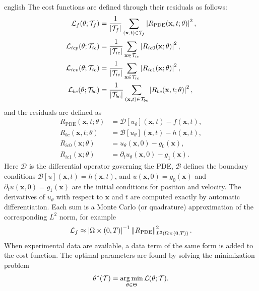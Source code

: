 \begin{hyphenrules}{english}
The cost functions are defined through their residuals as follows:
\begin{align}
  \mathcal{L}_f(\theta;\mathcal{T}_f)&=\frac{1}{\left\lvert \mathcal{T}_f \right\rvert}\sum_{(\mathbf{x},t)\in\mathcal{T}_f}\left\lvert R_{\mathrm{PDE}}(\mathbf{x},t;\theta) \right\rvert^2,\label{eq:loss-f}\\
  \mathcal{L}_{icp}(\theta;\mathcal{T}_{ic})&=\frac{1}{\left\lvert \mathcal{T}_{ic} \right\rvert}\sum_{\mathbf{x}\in\mathcal{T}_{ic}}\left\lvert R_{ic0}(\mathbf{x};\theta) \right\rvert^2,\label{eq:loss-icp}\\
  \mathcal{L}_{icv}(\theta;\mathcal{T}_{ic})&=\frac{1}{\left\lvert \mathcal{T}_{ic} \right\rvert}\sum_{\mathbf{x}\in\mathcal{T}_{ic}}\left\lvert R_{ic1}(\mathbf{x};\theta) \right\rvert^2,\label{eq:loss-icv}\\
  \mathcal{L}_{bc}(\theta;\mathcal{T}_{bc})&=\frac{1}{\left\lvert \mathcal{T}_{bc} \right\rvert}\sum_{(\mathbf{x},t)\in\mathcal{T}_{bc}}\left\lvert R_{bc}(\mathbf{x},t;\theta) \right\rvert^2,\label{eq:loss-bc}
\end{align}
and the residuals are defined as
\begin{align}
  R_{\mathrm{PDE}}(\mathbf{x},t;\theta)&=\mathcal{D}[u_\theta](\mathbf{x},t)-f(\mathbf{x},t), \label{eq:res-pde}\\
  R_{bc}(\mathbf{x},t;\theta)&=\mathcal{B}[u_\theta](\mathbf{x},t)-h(\mathbf{x},t), \label{eq:res-bc}\\
  R_{ic0}(\mathbf{x};\theta)&=u_\theta(\mathbf{x},0)-g_0(\mathbf{x}), \label{eq:res-ic0}\\
  R_{ic1}(\mathbf{x};\theta)&=\partial_t u_\theta(\mathbf{x},0)-g_1(\mathbf{x}). \label{eq:res-ic1}
\end{align}
Here $\mathcal{D}$ is the differential operator governing the PDE, $\mathcal{B}$ defines the boundary
conditions $\mathcal{B}[u](\mathbf{x},t)=h(\mathbf{x},t)$, and $u(\mathbf{x},0)=g_0(\mathbf{x})$ and $\partial_t u(\mathbf{x},0)=g_1(\mathbf{x})$ are the
initial conditions for position and velocity. The derivatives of $u_\theta$ with respect to $\mathbf{x}$ and $t$
are computed exactly by automatic differentiation. Each sum is a Monte Carlo (or quadrature)
approximation of the corresponding $L^2$ norm, for example
\[
  \mathcal{L}_f\approx\left\lvert \Omega\times(0,T) \right\rvert^{-1}\left\lVert R_{\mathrm{PDE}} \right\rVert_{L^2(\Omega\times(0,T))}^2.
\]
When
experimental data are available, a data term of the same form is added to the cost function. The optimal
parameters are found by solving the minimization problem
\begin{equation}
  \theta^{*}(\mathcal{T})=\operatorname*{arg\,min}_{\theta\in\Theta}\mathcal{L}(\theta;\mathcal{T}).
  \label{eq:pinn-argmin}
\end{equation}


\end{hyphenrules}
